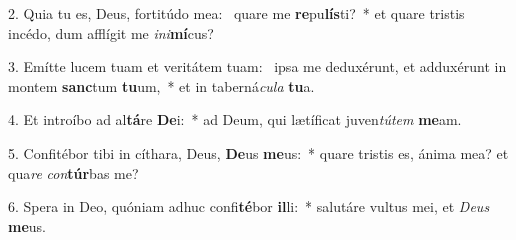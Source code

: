 2. Quia tu es, Deus, fortitúdo mea: \dag\  quare me \textbf{re}pu\textbf{lís}ti?~*  et quare tristis incédo, dum afflígit me \textit{in}\textit{i}\textbf{mí}cus?\

3. Emítte lucem tuam et veritátem tuam: \dag\  ipsa me deduxérunt, et adduxérunt in montem \textbf{sanc}tum \textbf{tu}um,~*  et in taberná\textit{cu}\textit{la} \textbf{tu}a.\

4. Et introíbo ad al\textbf{tá}re \textbf{De}i:~*  ad Deum, qui lætíficat juven\textit{tú}\textit{tem} \textbf{me}am.\

5. Confitébor tibi in cíthara, Deus, \textbf{De}us \textbf{me}us:~*  quare tristis es, ánima mea? et qua\textit{re} \textit{con}\textbf{túr}bas me?\

6. Spera in Deo, quóniam adhuc confi\textbf{té}bor \textbf{il}li:~*  salutáre vultus mei, et \textit{De}\textit{us} \textbf{me}us.\

